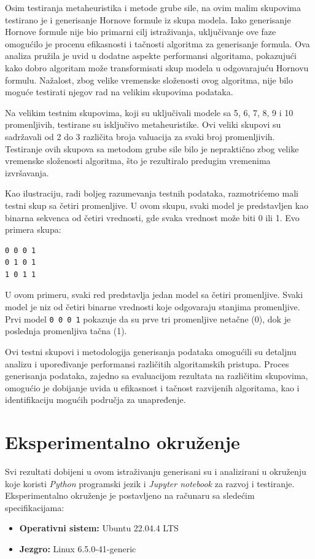 \documentclass[12pt,oneside]{memoir}
\begin{document}
Osim testiranja metaheuristika i metode grube sile, na ovim malim skupovima testirano je i generisanje Hornove formule iz skupa modela. Iako generisanje Hornove formule nije bio primarni cilj istraživanja, uključivanje ove faze omogućilo je procenu efikasnosti i tačnosti algoritma za generisanje formula. Ova analiza pružila je uvid u dodatne aspekte performansi algoritama, pokazujući kako dobro algoritam može transformisati skup modela u odgovarajuću Hornovu formulu. Nažalost, zbog velike vremenske složenosti ovog algoritma, nije bilo moguće testirati njegov rad na velikim skupovima podataka.


Na velikim testnim skupovima, koji su uključivali modele sa 5, 6, 7, 8, 9 i 10 promenljivih, testirane su isključivo metaheuristike. Ovi veliki skupovi su sadržavali od 2 do 3 različita broja valuacija za svaki broj promenljivih. Testiranje ovih skupova sa metodom grube sile bilo je nepraktično zbog velike vremenske složenosti algoritma, što je rezultiralo predugim vremenima izvršavanja. 

Kao ilustraciju, radi boljeg razumevanja testnih podataka, razmotrićemo mali testni skup sa četiri promenljive. U ovom skupu, svaki model je predstavljen kao binarna sekvenca od četiri vrednosti, gde svaka vrednost može biti 0 ili 1. Evo primera skupa:

\begin{verbatim}
0 0 0 1
0 1 0 1
1 0 1 1
\end{verbatim}

U ovom primeru, svaki red predstavlja jedan model sa četiri promenljive. Svaki model je niz od četiri binarne vrednosti koje odgovaraju stanjima promenljive. Prvi model \texttt{0 0 0 1} pokazuje da su prve tri promenljive netačne (0), dok je poslednja promenljiva tačna (1).


Ovi testni skupovi i metodologija generisanja podataka omogućili su detaljnu analizu i upoređivanje performansi različitih algoritamskih pristupa. Proces generisanja podataka, zajedno sa evaluacijom rezultata na različitim skupovima, omogućio je dobijanje uvida u efikasnost i tačnost razvijenih algoritama, kao i identifikaciju mogućih područja za unapređenje.

\section{Eksperimentalno okruženje}
Svi rezultati dobijeni u ovom istraživanju generisani su i analizirani u okruženju koje koristi \textit{Python} programski jezik i \textit{Jupyter notebook} za razvoj i testiranje. Eksperimentalno okruženje je postavljeno na računaru sa sledećim specifikacijama:
\begin{itemize}
    \item \textbf{Operativni sistem:} Ubuntu 22.04.4 LTS
    \item \textbf{Jezgro:} Linux 6.5.0-41-generic
\end{itemize}
\end{document}
